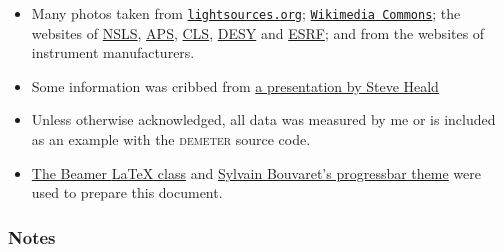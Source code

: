 \documentclass[10pt, xcolor=x11names, compress]{beamer}
\begin{document}
\begin{frame}
  \frametitle{}
  
  \begin{itemize}
  \footnotesize
  \item Many photos taken from \href{http://lightsources.org}%
    {\color{Brown4}\texttt{lightsources.org}};
    \href{http://commons.wikimedia.org}%
    {\color{Brown4}\texttt{Wikimedia Commons}}; the
    websites of %
    \href{http://www.nsls.bnl.gov/} {\color{Brown4}NSLS}, 
    \href{http://www.aps.anl.gov/}  {\color{Brown4}APS}, 
    \href{http://www.lightsource.ca}{\color{Brown4}CLS},
    \href{http://hasylab.desy.de/}  {\color{Brown4}DESY} and
    \href{http://www.esrf.eu/}      {\color{Brown4}ESRF}; and from the
    websites of instrument manufacturers.
  \item Some information was cribbed from 
    \href{http://xafs.org/Workshops/APS2007?action=AttachFile&do=get&target=Heald_Detectors.pdf}
    {\color{Brown4}a presentation by Steve Heald}
  \item Unless otherwise acknowledged, all data was measured by me or
    is included as an example with the \textsc{demeter} source code.
  \item \href{http://latex-beamer.sourceforge.net/}%
    {\color{Brown4}The Beamer {\LaTeX} class} and 
    \href{http://recherche.noiraudes.net/fr/LaTeX.php}
    {\color{Brown4}Sylvain Bouvaret's progressbar theme}
    were used to prepare this document.
  \end{itemize}
\end{frame}

\begin{frame}
  \frametitle{Notes}
  
\end{frame}
\end{document}
